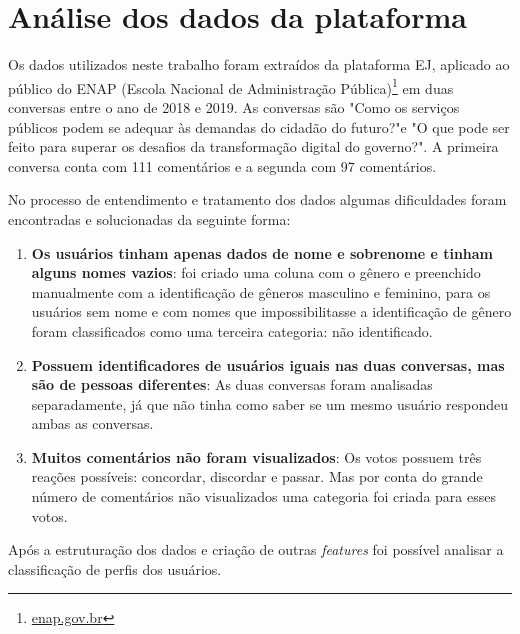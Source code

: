 




\section{Análise dos dados da plataforma}

Os dados utilizados neste trabalho foram extraídos da plataforma EJ, aplicado ao público do ENAP (Escola Nacional de Administração Pública)\footnote{\href{enap.gov.br}{enap.gov.br}} em duas conversas entre o ano de 2018 e 2019. As conversas são "Como os serviços públicos podem se adequar às demandas do cidadão do futuro?"e "O que pode ser feito para superar os desafios da transformação digital do governo?". A primeira conversa conta com 111 comentários e a segunda com 97 comentários.

No processo de entendimento e tratamento dos dados algumas dificuldades foram encontradas e solucionadas da seguinte  forma:

\begin{enumerate}
\item \textbf{Os usuários tinham apenas dados de nome e sobrenome e tinham alguns nomes vazios}: foi criado uma coluna com o gênero e preenchido manualmente com a identificação de gêneros masculino e feminino, para os usuários sem nome e com nomes que impossibilitasse a identificação de gênero foram classificados como uma terceira categoria: não identificado.
\item \textbf{Possuem identificadores de usuários iguais nas duas conversas, mas são de pessoas diferentes}: As duas conversas foram analisadas separadamente, já que não tinha como saber se um mesmo usuário respondeu ambas as conversas.
\item \textbf{Muitos comentários não foram visualizados}: Os votos possuem três reações possíveis: concordar, discordar e passar. Mas por conta do grande número de comentários não visualizados uma categoria foi criada para esses votos.
\end{enumerate}

Após a estruturação dos dados e criação de outras \textit{features} foi possível analisar a classificação de perfis dos usuários.
 

